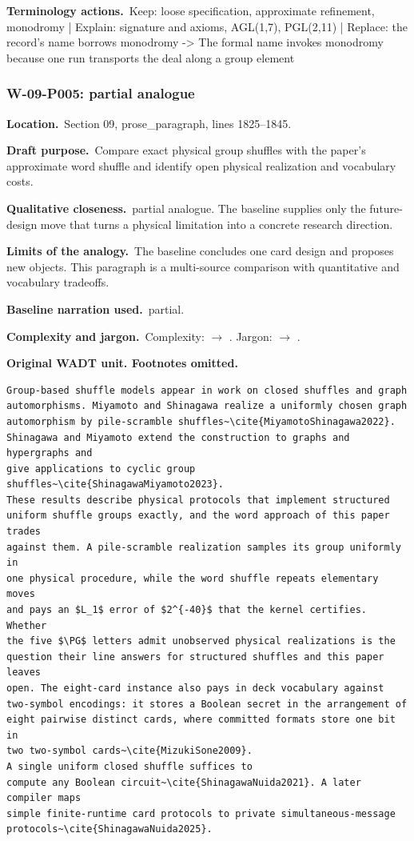 \documentclass[10pt]{article}
\renewcommand{\cite}[1]{\textnormal{[\texttt{\detokenize{#1}}]}}\renewcommand{\label}[1]{}
\newcommand{\Field}[2]{\textbf{#1}\ #2\par}\newcommand{\Tag}[1]{\fcolorbox{black!25}{black!4}{\strut\scriptsize #1}}
\begin{document}
\Field{Terminology actions.}{Keep: loose specification, approximate refinement, monodromy | Explain: signature and axioms, AGL(1,7), PGL(2,11) | Replace: the record's name borrows monodromy -> The formal name invokes monodromy because one run transports the deal along a group element}
\par\smallskip
{}\subsubsection*{W-09-P005: partial analogue}
\Field{Location.}{Section 09, prose\_paragraph, lines 1825--1845.}
\Field{Draft purpose.}{Compare exact physical group shuffles with the paper's approximate word shuffle and identify open physical realization and vocabulary costs.}
\Field{Qualitative closeness.}{partial analogue. The baseline supplies only the future-design move that turns a physical limitation into a concrete research direction.}
\Field{Limits of the analogy.}{The baseline concludes one card design and proposes new objects. This paragraph is a multi-source comparison with quantitative and vocabulary tradeoffs.}
\Field{Baseline narration used.}{partial.}
\Field{Complexity and jargon.}{Complexity: \Tag{high} $\rightarrow$ \Tag{medium}. Jargon: \Tag{high} $\rightarrow$ \Tag{medium}.}
\textbf{Original WADT unit. Footnotes omitted.}
\begin{lstlisting}
Group-based shuffle models appear in work on closed shuffles and graph
automorphisms. Miyamoto and Shinagawa realize a uniformly chosen graph
automorphism by pile-scramble shuffles~\cite{MiyamotoShinagawa2022}.
Shinagawa and Miyamoto extend the construction to graphs and hypergraphs and
give applications to cyclic group shuffles~\cite{ShinagawaMiyamoto2023}.
These results describe physical protocols that implement structured
uniform shuffle groups exactly, and the word approach of this paper trades
against them. A pile-scramble realization samples its group uniformly in
one physical procedure, while the word shuffle repeats elementary moves
and pays an $L_1$ error of $2^{-40}$ that the kernel certifies. Whether
the five $\PG$ letters admit unobserved physical realizations is the
question their line answers for structured shuffles and this paper leaves
open. The eight-card instance also pays in deck vocabulary against
two-symbol encodings: it stores a Boolean secret in the arrangement of
eight pairwise distinct cards, where committed formats store one bit in
two two-symbol cards~\cite{MizukiSone2009}.
A single uniform closed shuffle suffices to
compute any Boolean circuit~\cite{ShinagawaNuida2021}. A later compiler maps
simple finite-runtime card protocols to private simultaneous-message
protocols~\cite{ShinagawaNuida2025}.
\end{lstlisting}
\end{document}
